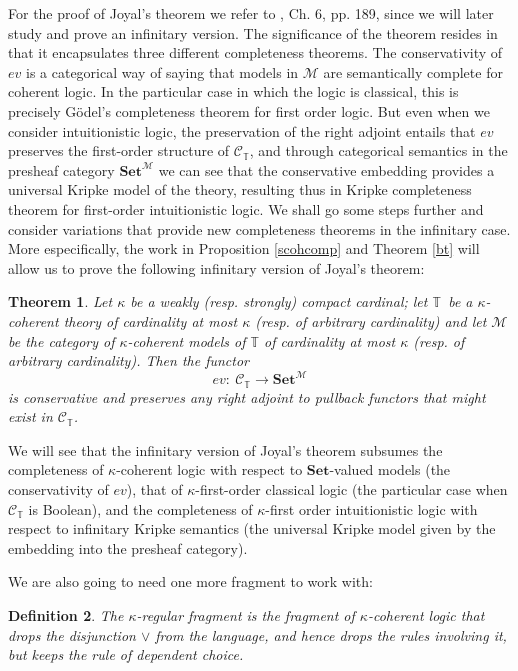 \documentclass[a4paper,11pt]{article}
\theoremstyle{plain}
\newtheorem{thm}{Theorem}[subsection]
\theoremstyle{plain}
\newtheorem{defs}[thm]{Definition}
\theoremstyle{remark}
\newcommand{\cat}[1]{\ensuremath{\mathcal{#1}}}
\newcommand{\synt}[2]{\ensuremath{\mathcal{#1}_{{#2}}}}
\newcommand{\Sets}{\ensuremath{\mathbf{Set}}}
\newcommand{\theory}{\ensuremath{\mathbb{T}}}
\begin{document}
For the proof of Joyal's theorem we refer to \cite{mr}, Ch. 6, pp. 189, since we will later study and prove an infinitary version. The significance of the theorem resides in that it encapsulates three different completeness theorems. The conservativity of $ev$ is a categorical way of saying that models in $\cat{M}$ are semantically complete for coherent logic. In the particular case in which the logic is classical, this is precisely G\"odel's completeness theorem for first order logic. But even when we consider intuitionistic logic, the preservation of the right adjoint entails that $ev$ preserves the first-order structure of $\synt{C}{\theory}$, and through categorical semantics in the presheaf category $\Sets^{\cat{M}}$ we can see that the conservative embedding provides a universal Kripke model of the theory, resulting thus in Kripke completeness theorem for first-order intuitionistic logic. We shall go some steps further and consider variations that provide new completeness theorems in the infinitary case. More especifically, the work in Proposition \ref{scohcomp} and Theorem \ref{bt} will allow us to prove the following infinitary version of Joyal's theorem:

\begin{thm}
Let $\kappa$ be a weakly (resp. strongly) compact cardinal; let \theory\ be a $\kappa$-coherent theory of cardinality at most $\kappa$ (resp. of arbitrary cardinality) and let $\cat{M}$ be the category of $\kappa$-coherent models of $\theory$ of cardinality at most $\kappa$ (resp. of arbitrary cardinality). Then the functor
% 
\[ev :\ \synt{C}{\theory}\to \Sets^{\cat{M}}\]
%
is conservative and preserves any right adjoint to pullback functors that might exist in $\synt{C}{\theory}$.
\end{thm}

We will see that the infinitary version of Joyal's theorem subsumes the completeness of $\kappa$-coherent logic with respect to \Sets-valued models (the conservativity of $ev$), that of $\kappa$-first-order classical logic (the particular case when $\synt{C}{\theory}$ is Boolean), and the completeness of $\kappa$-first order intuitionistic logic with respect to infinitary Kripke semantics (the universal Kripke model given by the embedding into the presheaf category).

We are also going to need one more fragment to work with:

\begin{defs}
 The $\kappa$-regular fragment is the fragment of $\kappa$-coherent logic that drops the disjunction $\vee$ from the language, and hence drops the rules involving it, but keeps the rule of dependent choice.
\end{defs}
\end{document}
